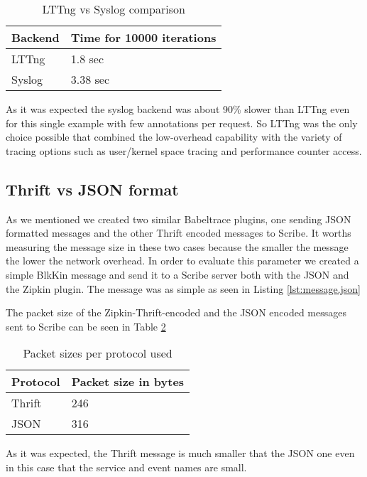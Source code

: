 \begin{table}[H]
    \centering
    \begin{tabular}{ | l | l | }
        \hline
        Backend & Time for 10000 iterations \\ \hline \hline
        LTTng &  1.8 sec \\ \hline
        Syslog & 3.38 sec \\ \hline
    \end{tabular}
    \caption{LTTng vs Syslog comparison}
    \label{tab:lttng-syslog}
\end{table}

As it was expected the syslog backend was about 90\% slower than LTTng even for
this single example with few annotations per request. So LTTng was the only
choice possible that combined the low-overhead capability with the variety of
tracing options such as user/kernel space tracing and performance counter
access.

\subsection{Thrift vs JSON format}
As we mentioned we created two similar Babeltrace plugins, one sending JSON
formatted messages and the other Thrift encoded messages to Scribe. It worths
measuring the message size in these two cases because the smaller the message
the lower the network overhead.
In order to evaluate this parameter we created a simple BlkKin message and send
it to a Scribe server both with the JSON and the Zipkin plugin. The message was
as simple as seen in Listing \ref{lst:message.json}


The packet size of the Zipkin-Thrift-encoded and the JSON encoded messages sent
to Scribe can be seen in Table \ref{tab:payloads}

\begin{table}[H]
    \centering
    \begin{tabular}{ | l | l | }
        \hline
        Protocol & Packet size in bytes \\ \hline \hline
        Thrift & 246 \\ \hline
        JSON  & 316 \\ \hline
    \end{tabular}
    \caption{Packet sizes per protocol used}
    \label{tab:payloads}
\end{table}

As it was expected, the Thrift message is much smaller that the JSON one even in
this case that the service and event names are small.


